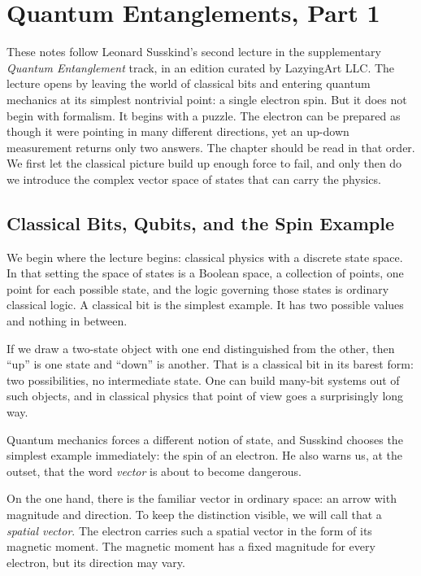 \chapter{Quantum Entanglements, Part 1}

These notes follow Leonard Susskind's second lecture in the supplementary \emph{Quantum Entanglement} track, in an edition curated by LazyingArt LLC. The lecture opens by leaving the world of classical bits and entering quantum mechanics at its simplest nontrivial point: a single electron spin. But it does not begin with formalism. It begins with a puzzle. The electron can be prepared as though it were pointing in many different directions, yet an up-down measurement returns only two answers. The chapter should be read in that order. We first let the classical picture build up enough force to fail, and only then do we introduce the complex vector space of states that can carry the physics.

\section{Classical Bits, Qubits, and the Spin Example}

We begin where the lecture begins: classical physics with a discrete state space. In that setting the space of states is a Boolean space, a collection of points, one point for each possible state, and the logic governing those states is ordinary classical logic. A classical bit is the simplest example. It has two possible values and nothing in between.

If we draw a two-state object with one end distinguished from the other, then ``up'' is one state and ``down'' is another. That is a classical bit in its barest form: two possibilities, no intermediate state. One can build many-bit systems out of such objects, and in classical physics that point of view goes a surprisingly long way.

Quantum mechanics forces a different notion of state, and Susskind chooses the simplest example immediately: the spin of an electron. He also warns us, at the outset, that the word \emph{vector} is about to become dangerous.

On the one hand, there is the familiar vector in ordinary space: an arrow with magnitude and direction. To keep the distinction visible, we will call that a \emph{spatial vector}. The electron carries such a spatial vector in the form of its magnetic moment. The magnetic moment has a fixed magnitude for every electron, but its direction may vary.

